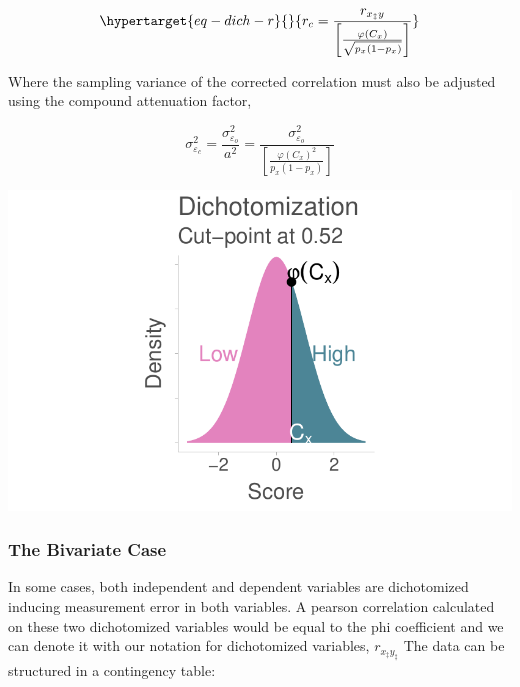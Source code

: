 \documentclass[
  letterpaper,
  DIV=11,
  numbers=noendperiod]{scrreprt}
\begin{document}
\begin{equation}\protect\hypertarget{eq-dich-r}{}{
r_c = \frac{r_{x_\ddagger y}}{\left[\frac{\varphi(C_x)}{\sqrt{p_x(1-p_x)}} \right]}
}\label{eq-dich-r}\end{equation}

Where the sampling variance of the corrected correlation must also be
adjusted using the compound attenuation factor,

\[
\sigma^2_{\varepsilon_c} =\frac{\sigma^2_{\varepsilon_o}} {a^2} =\frac{\sigma^2_{\varepsilon_o}} {\left[\frac{\varphi(C_x)^2}{p_x(1-p_x)} \right]}
\]

\includegraphics{artificial_dichotomization_files/figure-pdf/unnamed-chunk-2-1.pdf}

\hypertarget{the-bivariate-case}{%
\subsubsection*{The Bivariate Case}\label{the-bivariate-case}}

In some cases, both independent and dependent variables are dichotomized
inducing measurement error in both variables. A pearson correlation
calculated on these two dichotomized variables would be equal to the phi
coefficient and we can denote it with our notation for dichotomized
variables, \(r_{x_\ddagger y_\ddagger}\) The data can be structured in a
contingency table:
\end{document}
